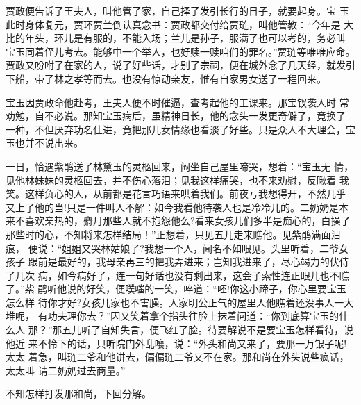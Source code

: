 贾政便告诉了王夫人，叫他管了家，自己择了发引长行的日子，就要起身。宝
玉此时身体复元，贾环贾兰倒认真念书：贾政都交付给贾琏，叫他管教：“今年是
大比的年头，环儿是有服的，不能入场；兰儿是孙子，服满了也可以考的，务必叫
宝玉同着侄儿考去。能够中一个举人，也好赎一赎咱们的罪名。”贾琏等唯唯应命。
贾政又吩咐了在家的人，说了好些话，才别了宗祠，便在城外念了几天经，就发引
下船，带了林之孝等而去。也没有惊动亲友，惟有自家男女送了一程回来。

宝玉因贾政命他赴考，王夫人便不时催逼，查考起他的工课来。那宝钗袭人时
常劝勉，自不必说。那知宝玉病后，虽精神日长，他的念头一发更奇僻了，竟换了
一种，不但厌弃功名仕进，竟把那儿女情缘也看淡了好些。只是众人不大理会，宝
玉也并不说出来。

一日，恰遇紫鹃送了林黛玉的灵柩回来，闷坐自己屋里啼哭，想着：“宝玉无
情，见他林妹妹的灵柩回去，并不伤心落泪；见我这样痛哭，也不来劝慰，反瞅着
我笑。这样负心的人，从前都是花言巧语来哄着我们。前夜亏我想得开，不然几乎
又上了他的当!只是一件叫人不解：如今我看他待袭人也是冷冷儿的。二奶奶是本
来不喜欢亲热的，麝月那些人就不抱怨他么?看来女孩儿们多半是痴心的，白操了
那些时的心，不知将来怎样结局！”正想着，只见五儿走来瞧他。见紫鹃满面泪痕，
便说：“姐姐又哭林姑娘了?我想一个人，闻名不如眼见。头里听着，二爷女孩子
跟前是最好的，我母亲再三的把我弄进来；岂知我进来了，尽心竭力的伏侍了几次
病，如今病好了，连一句好话也没有剩出来，这会子索性连正眼儿也不瞧了。”紫
鹃听他说的好笑，便噗嗤的一笑，啐道：“呸!你这小蹄子，你心里要宝玉怎么样
待你才好?女孩儿家也不害臊。人家明公正气的屋里人他瞧着还没事人一大堆呢，
有功夫理你去？”因又笑着拿个指头往脸上抹着问道：“你到底算宝玉的什么人
那？”那五儿听了自知失言，便飞红了脸。待要解说不是要宝玉怎样看待，说他近
来不怜下的话，只听院门外乱嚷，说：“外头和尚又来了，要那一万银子呢!太太
着急，叫琏二爷和他讲去，偏偏琏二爷又不在家。那和尚在外头说些疯话，太太叫
请二奶奶过去商量。”

不知怎样打发那和尚，下回分解。